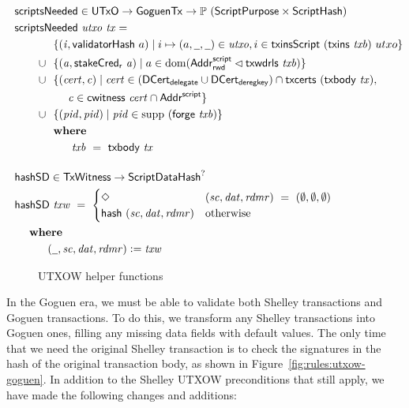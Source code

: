 \begin{figure}[htb]
  \begin{align*}
    & \hspace{-1cm}\fun{scriptsNeeded} \in \UTxO \to \GoguenTx \to \powerset (\ScriptPurpose \times \ScriptHash) \\
    & \hspace{-1cm}\fun{scriptsNeeded}~\var{utxo}~\var{tx} = \\
    & ~~\{ (\var{i}, \fun{validatorHash}~a) \mid i \mapsto (a, \wcard, \wcard) \in \var{utxo},
      i\in\fun{txinsScript}~{(\fun{txins~\var{txb}})}~{utxo}\} \\
    \cup & ~~\{ (\var{a}, \fun{stakeCred_{r}}~\var{a}) \mid a \in \dom (\AddrRWDScr
           \restrictdom \fun{txwdrls}~\var{txb}) \} \\
    \cup & ~~\{ (\var{cert}, \var{c}) \mid \var{cert} \in (\DCertDeleg \cup \DCertDeRegKey)\cap\fun{txcerts}~(\txbody{tx}), \\
    & ~~~~~~\var{c} \in \cwitness{cert} \cap \AddrScr\} \\
      \cup & ~~\{ (\var{pid}, \var{pid}) \mid \var{pid} \in \supp~(\fun{forge}~\var{txb}) \} \\
    & \where \\
    & ~~~~~~~ \var{txb}~=~\txbody{tx}
    \nextdef
    & \hspace{-1cm}\fun{hashSD} \in \TxWitness \to \ScriptDataHash^? \\
    & \hspace{-1cm}\fun{hashSD}~\var{txw}~=~
      \begin{cases}
        \Nothing & (\var{sc}, \var{dat}, \var{rdmr}) ~=~ (\emptyset, \emptyset, \emptyset) \\
        \fun{hash}~(\var{sc}, \var{dat}, \var{rdmr}) & \text{otherwise}
      \end{cases} \\
    & \hspace{-1cm} ~~\where \\
    & \hspace{-1cm} ~~~~~~~~~ (\wcard, \var{sc}, \var{dat}, \var{rdmr})\leteq\var{txw}
  \end{align*}
  \caption{UTXOW helper functions}
  \label{fig:functions-witnesses}
\end{figure}

In the Goguen era, we must be able to validate both Shelley transactions
and Goguen transactions. To do this, we transform any Shelley transactions
into Goguen ones, filling any missing data fields with default values.
The only time that we need the original Shelley transaction is to check the signatures
in the hash of the original transaction body, as shown in
Figure~\ref{fig:rules:utxow-goguen}. In addition to the Shelley UTXOW preconditions
that still apply, we have made the following changes and additions:

